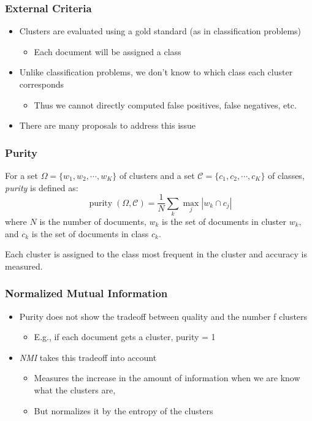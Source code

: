 \documentclass[svgnames]{beamer}
\begin{document}
\begin{frame}
    \frametitle{External Criteria}
    \begin{itemize}
    \item Clusters are evaluated using a gold standard (as in classification
        problems)
        \begin{itemize}
        \item Each document will be assigned a class
    \end{itemize}
    \item Unlike classification problems, we don't know to which class each
        cluster corresponds
        \begin{itemize}
        \item Thus we cannot directly computed false positives, false
            negatives, etc.
        \end{itemize}
    \item There are many proposals to address this issue
    \end{itemize}
\end{frame}

\begin{frame}
    \frametitle{Purity}
    \begin{block}{}
        For a set $\Omega = \{w_1,w_2,\cdots,w_K\}$ of clusters and a set
        $\mathcal{C} = \{c_1,c_2,\cdots,c_K\}$ of classes, \emph{purity} is
        defined as:
        \begin{displaymath}
            \operatorname{purity}(\Omega, \mathcal{C}) = \frac{1}{N} \sum_k\max_j|w_k \cap c_j|
        \end{displaymath}
        where $N$ is the number of documents, $w_k$ is the set of documents in
        cluster $w_k$, and $c_k$ is the set of documents in class $c_k$.
    \end{block}
    Each cluster is assigned to the class most frequent in the cluster and
    accuracy is measured.
\end{frame}


\begin{frame}
    \frametitle{Normalized Mutual Information}
    \begin{itemize}
    \item Purity does not show the tradeoff between quality and the number f
        clusters
        \begin{itemize}
        \item E.g., if each document gets a cluster, purity = 1
        \end{itemize}
    \item \emph{NMI} takes this tradeoff into account
        \begin{itemize}
        \item Measures the increase in the amount of information when we are
            know what the clusters are,
        \item But normalizes it by the entropy of the clusters
        \end{itemize}
    \end{itemize}
\end{frame}
\end{document}
